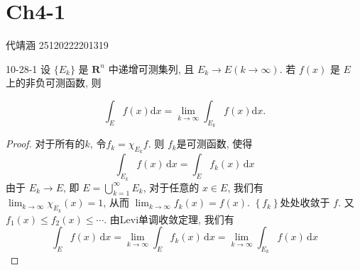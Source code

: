 \documentclass[../main.tex]{subfiles}
\begin{document}
\ifSubfilesClassLoaded{

    
    \setcounter{chapter}{3}
}{}

\chapter{ Ch4-1 }
 代靖涵 25120222201319

 \begin{exercise}{}{10-28-1}
    设 $\{E_k\}$ 是 $\mathbf{R}^n$ 中递增可测集列, 且 $E_k \to E(k \to \infty)$. 若 $f(x)$ 是 $E$ 上的非负可测函数, 则
 
\[
\int_E f(x) \mathrm{d}x = \lim_{k \to \infty} \int_{E_k} f(x) \mathrm{d}x.
\]
 \end{exercise}
 \begin{proof}
    对于所有的\(  k  \),  令\(  f_{k}= \chi _{E_{k}}f  \). 则 \(  f_{k}  \)是可测函数, 使得 \[
    \int_{E_{k}}f\left( x \right)\,\mathrm{d} x=  \int_{E} f_{k}\left( x \right)\,\mathrm{d} x  
    \]由于 \(  E_{k}\to E  \), 即  \(  E= \bigcup _{k= 1}^{\infty}E_{k}  \), 对于任意的 \(  x \in E  \), 我们有 \(  \lim_{k\to \infty}\chi _{E_{k}}\left( x \right)= 1   \), 从而 \(  \lim_{k\to \infty}f_{k}\left( x \right)= f\left( x \right)    \).  \(  \left\{ f_{k} \right\}  \)处处收敛于 \(  f  \).       又 \(  f_{1}\left( x \right)\le f_2 \left( x \right)\le \cdots    \). 由Levi单调收敛定理, 我们有 \[
\int_{E}f\left( x \right)\,\mathrm{d} x= \lim_{k\to \infty}\int_{E}f_{k}\left( x \right)\,\mathrm{d} x= \lim_{k\to \infty}\int_{E_{k}}  f\left( x \right)\,\mathrm{d} x 
    \] 
 \end{proof}
\end{document}
